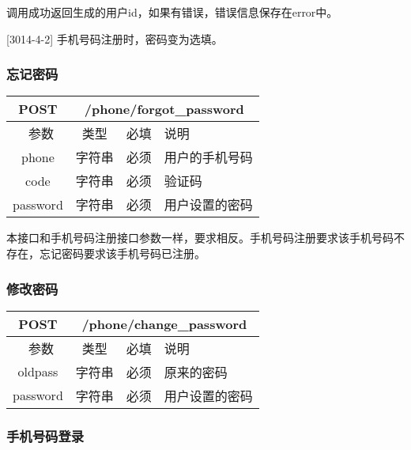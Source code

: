 调用成功返回生成的用户id，如果有错误，错误信息保存在error中。

[3014-4-2] 手机号码注册时，密码变为选填。

\subsubsection{忘记密码}
\label{hash_algorithm}

\begin{table}[H]
   \begin{center}
\begin{tabular}{|c|c|c|p{12cm}|}
\hline
POST & \multicolumn{3}{|c|}{/phone/forgot\_password} \\
\hline\hline
 \  参数  & 类型 & 必填 &  说明  \\
\hline
 phone  & 字符串 & 必须 &  用户的手机号码\\
\hline
 code  & 字符串 & 必须 &  验证码\\
\hline
 password  & 字符串 & 必须 &  用户设置的密码\\
\hline
\end{tabular}
   \end{center}
\end{table}

本接口和手机号码注册接口参数一样，要求相反。手机号码注册要求该手机号码不存在，忘记密码要求该手机号码已注册。


\subsubsection{修改密码}
\label{hash_algorithm}

\begin{table}[H]
   \begin{center}
\begin{tabular}{|c|c|c|p{12cm}|}
\hline
POST & \multicolumn{3}{|c|}{/phone/change\_password} \\
\hline\hline
 \  参数  & 类型 & 必填 &  说明  \\
\hline
 oldpass  & 字符串 & 必须 &  原来的密码\\
\hline
 password  & 字符串 & 必须 &  用户设置的密码\\
\hline
\end{tabular}
   \end{center}
\end{table}



\subsubsection{手机号码登录}
\label{hash_algorithm}

